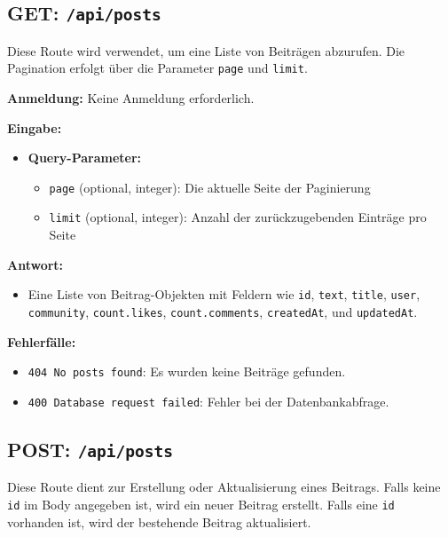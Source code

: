 \documentclass[a4paper,12pt]{article}
\begin{document}
\subsection{GET: \texttt{/api/posts}}

Diese Route wird verwendet, um eine Liste von Beiträgen abzurufen. Die
Pagination erfolgt über die Parameter \texttt{page} und \texttt{limit}.

\textbf{Anmeldung:} Keine Anmeldung erforderlich.

\textbf{Eingabe:}
\begin{itemize}
    \item \textbf{Query-Parameter:}
    \begin{itemize}
        \item \texttt{page} (optional, integer):
            Die aktuelle Seite der Paginierung
        \item \texttt{limit} (optional, integer):
            Anzahl der zurückzugebenden Einträge pro Seite
    \end{itemize}
\end{itemize}

\textbf{Antwort:}
\begin{itemize}
    \item Eine Liste von Beitrag-Objekten mit Feldern wie
        \texttt{id},
        \texttt{text},
        \texttt{title},
        \texttt{user},
        \texttt{community},
        \texttt{count.likes},
        \texttt{count.comments},
        \texttt{createdAt},
        und \texttt{updatedAt}.
\end{itemize}

\textbf{Fehlerfälle:}
\begin{itemize}
    \item \texttt{404 No posts found}:
        Es wurden keine Beiträge gefunden.
    \item \texttt{400 Database request failed}:
        Fehler bei der Datenbankabfrage.
\end{itemize}

\subsection{POST: \texttt{/api/posts}}

Diese Route dient zur Erstellung oder Aktualisierung eines Beitrags. Falls
keine \texttt{id} im Body angegeben ist, wird ein neuer Beitrag erstellt. Falls
eine \texttt{id} vorhanden ist, wird der bestehende Beitrag aktualisiert.
\end{document}
